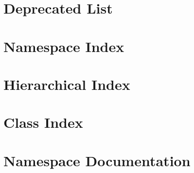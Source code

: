 \let\mypdfximage\pdfximage\def\pdfximage{\immediate\mypdfximage}\documentclass[twoside]{book}
\newcommand{\+}{\discretionary{\mbox{\scriptsize$\hookleftarrow$}}{}{}}
\begin{document}
\chapter{Deprecated List}
\label{deprecated}

\chapter{Namespace Index}

\chapter{Hierarchical Index}

\chapter{Class Index}

\chapter{Namespace Documentation}























\end{document}
